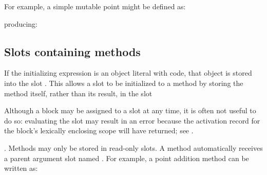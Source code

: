\documentclass[letterpaper,10pt,english]{sphinxmanual}
\begin{document}
For example, a simple mutable point might be defined as:

\begin{sphinxVerbatim}[commandchars=\\\{\}]
     
\end{sphinxVerbatim}

producing:
\begin{figure}[htbp]
\centering

\noindent{}
\end{figure}


\subsection{Slots containing methods}
\label{\detokenize{langref:index-39}}\label{\detokenize{langref:pp-argument-slots}}\label{\detokenize{langref:slots-containing-methods}}
If the initializing expression is an object literal with code, that object is stored into the slot . This allows a slot to be initialized to a method by storing the method itself, rather than its result, in the slot %
\begin{footnote}[6]\sphinxAtStartFootnote
Although a block may be assigned to a slot at any time, it is often not useful to do so: evaluating the slot may result in an error because the activation record for the block’s lexically enclosing scope will have returned; see {\hyperref[\detokenize{langref:pp-langref-blocks}]{}}.
%
\end{footnote}. Methods may only be stored in read-only slots. A method automatically receives a parent argument slot named . For example, a point addition method can be written as:

\begin{sphinxVerbatim}[commandchars=\\\{\}]
 
                       
 
\end{sphinxVerbatim}
\end{document}
